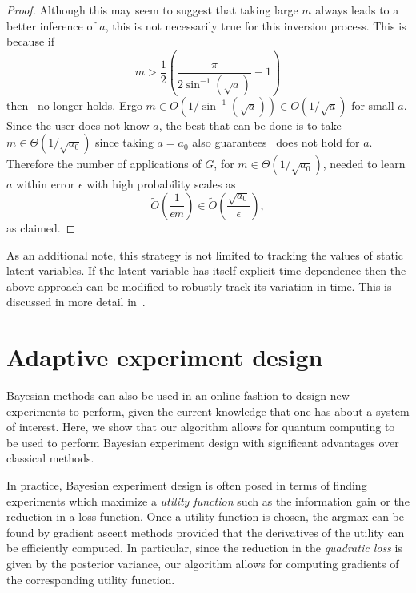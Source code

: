 \documentclass[aps,amsmath,onecolumn,amssymb,notitlepage]{revtex4-1}
\begin{document}
\begin{proof}
Although this may seem to suggest that taking large $m$ always leads to a better inference of $a$, this is not necessarily true for this inversion process.  This is because if 
\begin{equation}
m > \frac{1}{2}\left(\frac{\pi}{2\sin^{-1}(\sqrt{a})}-1\right)\label{eq:mvalid}
\end{equation} then~ no longer holds.  Ergo $m\in O(1/\sin^{-1}(\sqrt{a}))\in O(1/\sqrt{a})$ for small $a$.  Since the user does not know $a$, the best that can be done is to take $m\in \Theta(1/\sqrt{a_0})$ since taking $a=a_0$ also guarantees~ does not hold for $a$.  Therefore the number of applications of $G$, for $m\in \Theta(1/\sqrt{a_0})$, needed to learn $a$ within error $\epsilon$ with high probability scales as
\begin{equation}
\tilde O\left(\frac{1}{\epsilon m} \right) \in \tilde O\left(\frac{\sqrt{a_0}}{\epsilon} \right),
\end{equation}
as claimed.
\end{proof}

As an additional note, this strategy is not limited to tracking the values of static latent variables.  If the latent variable has itself explicit time dependence then the above approach can
be modified to robustly track its variation in time.  This is discussed in more detail in~.


\section{Adaptive experiment design}

Bayesian methods can also be used in an online fashion to design new
experiments to perform, given the current knowledge that one has about a
system of interest. Here, we show that our algorithm allows for quantum
computing to be used to perform Bayesian experiment design with significant
advantages over classical methods.

In practice, Bayesian experiment design is often posed in terms of finding
experiments which maximize a \emph{utility function} such as the information
gain or the reduction in a loss function. Once a utility function is
chosen, the argmax can be found by gradient ascent methods provided that the
derivatives of the utility can be efficiently computed. In particular, since
the reduction in the \emph{quadratic loss} is given by the posterior variance,
our algorithm allows for computing gradients of the corresponding utility
function.
\end{document}
